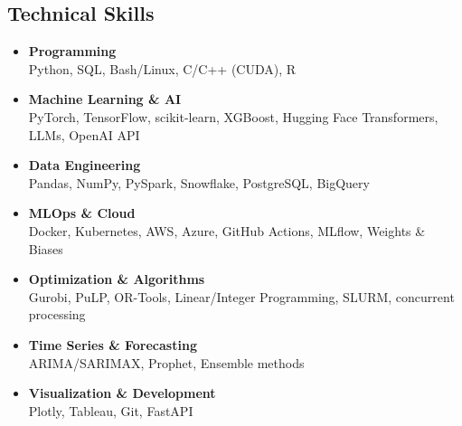 \documentclass[letterpaper,10pt]{article}
\makeatletter
\newcommand{\resumeSubheading}[4]{
  \vspace{-2pt}\item
    \begin{tabular*}{1.0\textwidth}[t]{l@{\extracolsep{\fill}}r}
      \textbf{#1} & \textbf{\small #2} \\
      \textit{\small#3} & \textit{\small #4} \\
    \end{tabular*}\vspace{-7pt}
}
\newcommand{\resumeSubHeadingListStart}{\begin{itemize}[leftmargin=0.0in, label={}]}
\newcommand{\resumeSubHeadingListEnd}{\end{itemize}}
\makeatother
\begin{document}
\begin{multicols}{2}
\subsection*{Technical Skills}
\begin{itemize}[leftmargin=0.15in]
    \item \textbf{Programming}\\
          Python, SQL, Bash/Linux, C/C++ (CUDA), R
    \item \textbf{Machine Learning \& AI}\\
          PyTorch, TensorFlow, scikit-learn, XGBoost, Hugging Face Transformers, LLMs, OpenAI API
    \item \textbf{Data Engineering}\\
          Pandas, NumPy, PySpark, Snowflake, PostgreSQL, BigQuery
    \item \textbf{MLOps \& Cloud}\\
          Docker, Kubernetes, AWS, Azure, GitHub Actions, MLflow, Weights \& Biases
    \item \textbf{Optimization \& Algorithms}\\
          Gurobi, PuLP, OR-Tools, Linear/Integer Programming, SLURM, concurrent processing
    \item \textbf{Time Series \& Forecasting}\\
          ARIMA/SARIMAX, Prophet, Ensemble methods
    \item \textbf{Visualization \& Development}\\
          Plotly, Tableau, Git, FastAPI
\end{itemize}

\end{multicols}



  
\vspace{-16pt}

\end{document}
